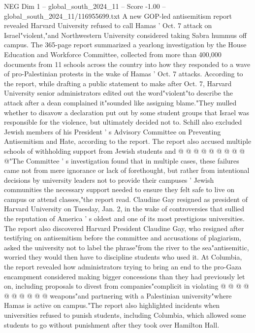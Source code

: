 \begin{textsample}{NEG Dim 1 – global\_south\_2024\_11 – Score -1.00 – global\_south\_2024\_11/116955699.txt}  \label{ex:f1_neg_199}
A new GOP-led antisemitism report revealed Harvard University refused to call Hamas ' Oct. 7 attack on Israel"violent,"and Northwestern University considered taking Sabra hummus off campus.
The 365-page report summarized a yearlong investigation by the House Education and Workforce Committee, collected from more than 400,000 documents from 11 schools across the country into how they responded to a wave of pro-Palestinian protests in the wake of Hamas ' Oct. 7 attacks.
According to the report, while drafting a public statement to make after Oct. 7, Harvard University senior administrators edited out the word"violent"to describe the attack after a dean complained it"sounded like assigning blame."They mulled whether to disavow a declaration put out by some student groups that Israel was responsible for the violence, but ultimately decided not to.
Schill also excluded Jewish members of his President ' s Advisory Committee on Preventing Antisemitism and Hate, according to the report.
The report also accused multiple schools of withholding support from Jewish students and @ @ @ @ @ @ @ @ @ @"The Committee ' s investigation found that in multiple cases, these failures came not from mere ignorance or lack of forethought, but rather from intentional decisions by university leaders not to provide their campuses ' Jewish communities the necessary support needed to ensure they felt safe to live on campus or attend classes,"the report read.
Claudine Gay resigned as president of Harvard University on Tuesday, Jan. 2, in the wake of controversies that sullied the reputation of America ' s oldest and one of its most prestigious universities.
The report also discovered Harvard President Claudine Gay, who resigned after testifying on antisemitism before the committee and accusations of plagiarism, asked the university not to label the phrase"from the river to the sea"antisemitic, worried they would then have to discipline students who used it.
At Columbia, the report revealed how administrators trying to bring an end to the pro-Gaza encampment considered making bigger concessions than they had previously let on, including proposals to divest from companies"complicit in violating @ @ @ @ @ @ @ @ @ @ weapons"and partnering with a Palestinian university"where Hamas is active on campus."The report also highlighted incidents when universities refused to punish students, including Columbia, which allowed some students to go without punishment after they took over Hamilton Hall.

\end{textsample}
